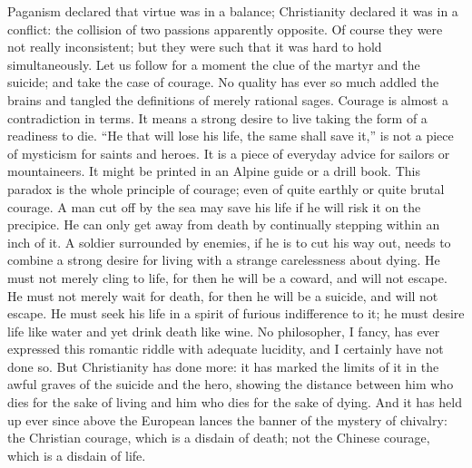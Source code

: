 \documentclass{book}
\begin{document}
Paganism declared that virtue was in a balance; Christianity declared it was in a conflict: the collision of two passions apparently opposite. Of course they were not really inconsistent; but they were such that it was hard to hold simultaneously. Let us follow for a moment the clue of the martyr and the suicide; and take the case of courage. No quality has ever so much addled the brains and tangled the definitions of merely rational sages. Courage is almost a contradiction in terms. It means a strong desire to live taking the form of a readiness to die. “He that will lose his life, the same shall save it,” is not a piece of mysticism for saints and heroes. It is a piece of everyday advice for sailors or mountaineers. It might be printed in an Alpine guide or a drill book. This paradox is the whole principle of courage; even of quite earthly or quite brutal courage. A man cut off by the sea may save his life if he will risk it on the precipice. He can only get away from death by continually stepping within an inch of it. A soldier surrounded by enemies, if he is to cut his way out, needs to combine a strong desire for living with a strange carelessness about dying. He must not merely cling to life, for then he will be a coward, and will not escape. He must not merely wait for death, for then he will be a suicide, and will not escape. He must seek his life in a spirit of furious indifference to it; he must desire life like water and yet drink death like wine. No philosopher, I fancy, has ever expressed this romantic riddle with adequate lucidity, and I certainly have not done so. But Christianity has done more: it has marked the limits of it in the awful graves of the suicide and the hero, showing the distance between him who dies for the sake of living and him who dies for the sake of dying. And it has held up ever since above the European lances the banner of the mystery of chivalry: the Christian courage, which is a disdain of death; not the Chinese courage, which is a disdain of life.
\end{document}
